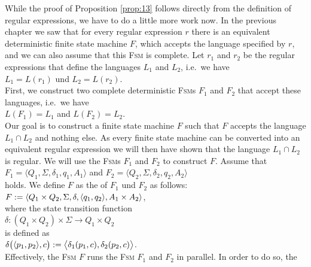 \proofEng
While the proof of Proposition \ref{prop:13} follows directly from the definition of regular expressions,
we have to do a little more work now. In the previous chapter we saw that for every regular expression
$r$ there is an equivalent deterministic finite state machine $F$, which accepts the language specified by $r$,
and we can also assume that this \textsc{Fsm} is complete. Let $r_1$ and $r_2$ be the regular expressions that
define the languages $L_1$ and $L_2$, i.e.~we have
\\[0.2cm]
\hspace*{1.3cm}
$L_1 = L(r_1)$ \quad und \quad $L_2 = L(r_2)$.
\\[0.2cm]
First, we construct two complete deterministic \textsc{Fsm}s
$F_1$ and $F_2$ that accept these languages, i.e.~we have
\\[0.2cm]
\hspace*{1.3cm}
$L(F_1) = L_1$ \quad and \quad $L(F_2) = L_2$.
\\[0.2cm]
Our goal is to construct a finite state machine $F$ such that $F$ accepts the language
$L_1 \cap L_2$ and nothing else.  As every finite state machine can be converted into an equivalent regular
expression we will then have shown that the language
$L_1 \cap L_2$ is regular.  We will use the \textsc{Fsm}s $F_1$ and $F_2$ to construct $F$.
Assume that
\\[0.2cm]
\hspace*{1.3cm}
$F_1 = \langle Q_1, \Sigma, \delta_1, q_1, A_1 \rangle$ \quad and \quad
$F_2 = \langle Q_2, \Sigma, \delta_2, q_2, A_2 \rangle$
\\[0.2cm]
holds.  We define $F$ as the  of $F_1$ und $F_2$ as follows:
\\[0.2cm]
\hspace*{1.3cm}
$F := \langle Q_1 \times Q_2, \Sigma, \delta, \pair(q_1,q_2), A_1 \times A_2 \rangle$,
\\[0.2cm]
where the state transition function 
\\[0.2cm]
\hspace*{1.3cm}
 $\delta : (Q_1 \times Q_2) \times \Sigma \rightarrow Q_1 \times Q_2$ 
\\[0.2cm]
is defined as
\\[0.2cm]
\hspace*{1.3cm}
$\delta\bigl( \pair(p_1, p_2), c \bigr) := \bigl\langle\delta_1(p_1,c), \delta_2(p_2,c)\bigr\rangle$.
\\[0.2cm]
Effectively, the \textsc{Fsm} $F$ runs the \textsc{Fsm} $F_1$ and $F_2$ in parallel.  In order to do so, the
